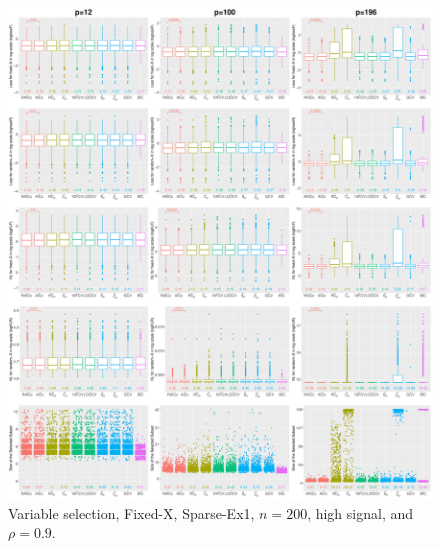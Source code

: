 \begin{figure}[!ht]
\centering
\includegraphics[width=\textwidth]{figures/supplement/fixedx/subset_selection/Sparse-Ex1_n200_hsnr_rho09.eps}
\caption{Variable selection, Fixed-X, Sparse-Ex1, $n=200$, high signal, and $\rho=0.9$.}
\end{figure}
\clearpage
